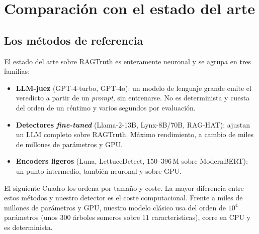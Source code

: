 \documentclass[12pt,a4paper]{report}
\theoremstyle{definition}
\begin{document}
\section{Comparación con el estado del arte}
\label{sec:sota}

\subsection{Los métodos de referencia}

El estado del arte sobre RAGTruth es enteramente neuronal y se agrupa en tres familias:
\begin{itemize}
  \item \textbf{LLM-juez} (GPT-4-turbo, GPT-4o): un modelo de lenguaje grande emite el veredicto
  a partir de un \emph{prompt}, sin entrenarse. No es determinista y cuesta del orden de un
  céntimo y varios segundos por evaluación.
  \item \textbf{Detectores \emph{fine-tuned}} (Llama-2-13B, Lynx-8B/70B, RAG-HAT): ajustan un LLM
  completo sobre RAGTruth. Máximo rendimiento, a cambio de miles de millones de parámetros y GPU.
  \item \textbf{Encoders ligeros} (Luna, LettuceDetect, $150$--$396$\,M sobre ModernBERT): un
  punto intermedio, también neuronal y sobre GPU.
\end{itemize}

El siguiente Cuadro los ordena por tamaño y coste. La mayor diferencia entre estos métodos y nuestro detector es el coste computacional. Frente a miles de millones de parámetros y GPU, nuestro modelo clásico usa del orden de $10^{4}$ parámetros (unos $300$ árboles someros sobre $11$ características), corre en CPU y es determinista.
\end{document}
